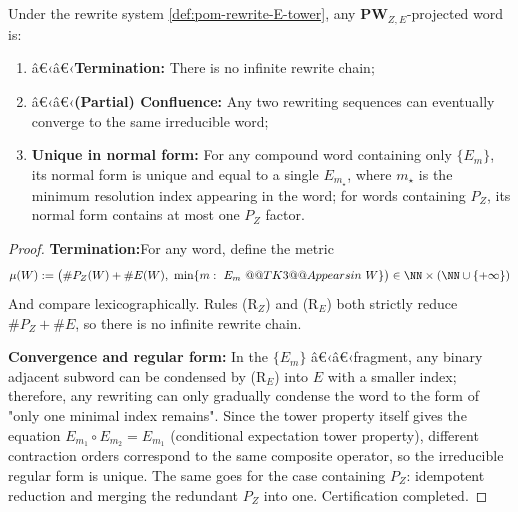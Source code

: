\begin{theorem}\label{thm:pom-rewrite-termination-confluence}
Under the rewrite system \ref{def:pom-rewrite-E-tower}, any $\mathbf{PW}_{Z,E}$-projected word is:
\begin{enumerate}
  \item â€‹â€‹\textbf{Termination:} There is no infinite rewrite chain;
  \item â€‹â€‹\textbf{(Partial) Confluence:} Any two rewriting sequences can eventually converge to the same irreducible word;
  \item \textbf{Unique in normal form:} For any compound word containing only $\{E_m\}$, its normal form is unique and equal to a single $E_{m_\star}$, where $m_\star$ is the minimum resolution index appearing in the word; for words containing $P_Z$, its normal form contains at most one $P_Z$ factor.
\end{enumerate}
\end{theorem}
\begin{proof}
\textbf{Termination:}For any word, define the metric
\[
\mu(W):=\bigl(\#P_Z(W)+\#E(W),\ \min\{m:\ E_m\ @@T K3@@{Appears in}\ W\}\bigr)\in\NN\times(\NN\cup\{+\infty\})
\]
And compare lexicographically. Rules (R$_Z$) and (R$_E$) both strictly reduce $\#P_Z+\#E$, so there is no infinite rewrite chain.

\textbf{Convergence and regular form:} In the $\{E_m\}$ â€‹â€‹fragment, any binary adjacent subword can be condensed by (R$_E$) into $E$ with a smaller index; therefore, any rewriting can only gradually condense the word to the form of "only one minimal index remains". Since the tower property itself gives the equation $E_{m_1}\circ E_{m_2}=E_{m_1}$ (conditional expectation tower property), different contraction orders correspond to the same composite operator, so the irreducible regular form is unique. The same goes for the case containing $P_Z$: idempotent reduction and merging the redundant $P_Z$ into one. Certification completed.
\end{proof}

